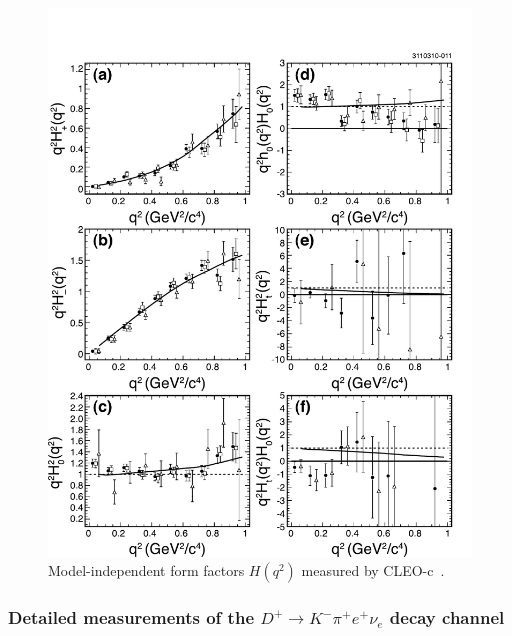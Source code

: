 \begin{figure}[htb]
  \begin{center}
    \vskip0.20in
    \includegraphics[width=4.in,angle=0., bb= -3 -3 595 720]{figures/charm/sl_cleoc_H.pdf}
  \end{center}
\vskip-0.20in
  \caption{Model-independent form factors $H(q^2)$ measured by 
    CLEO-c~\cite{Briere:2010zc}.
  \label{fig:cleoc_H}}
\end{figure}

\subsubsection{Detailed measurements of the $D^+ \rightarrow K^- \pi^+ e^+ \nu_e$ 
decay channel}

